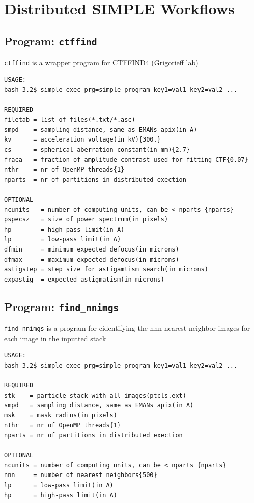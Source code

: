 \documentclass[a4paper,11pt]{article}
\newcommand{\prgname}[1]{\textcolor{NavyBlue}{\texttt{#1}}}
\begin{document}
\section{Distributed SIMPLE Workflows}
\subsection{Program: \prgname{ctffind}}
\label{ctffind}
\prgname{ctffind} is a wrapper program for CTFFIND4 (Grigorieff lab)

\begin{verbatim}
USAGE:
bash-3.2$ simple_exec prg=simple_program key1=val1 key2=val2 ...

REQUIRED
filetab = list of files(*.txt/*.asc)
smpd    = sampling distance, same as EMANs apix(in A)
kv      = acceleration voltage(in kV){300.}
cs      = spherical aberration constant(in mm){2.7}
fraca   = fraction of amplitude contrast used for fitting CTF{0.07}
nthr    = nr of OpenMP threads{1}
nparts  = nr of partitions in distributed exection

OPTIONAL
ncunits   = number of computing units, can be < nparts {nparts}
pspecsz   = size of power spectrum(in pixels)
hp        = high-pass limit(in A)
lp        = low-pass limit(in A)
dfmin     = minimum expected defocus(in microns)
dfmax     = maximum expected defocus(in microns)
astigstep = step size for astigamtism search(in microns)
expastig  = expected astigmatism(in microns)
\end{verbatim}

\subsection{Program: \prgname{find\_nnimgs}}
\label{find_nnimgs}
\prgname{find\_nnimgs} is a program for cidentifying the nnn nearest neighbor images for each image in the inputted stack

\begin{verbatim}
USAGE:
bash-3.2$ simple_exec prg=simple_program key1=val1 key2=val2 ...

REQUIRED
stk    = particle stack with all images(ptcls.ext)
smpd   = sampling distance, same as EMANs apix(in A)
msk    = mask radius(in pixels)
nthr   = nr of OpenMP threads{1}
nparts = nr of partitions in distributed exection

OPTIONAL
ncunits = number of computing units, can be < nparts {nparts}
nnn     = number of nearest neighbors{500}
lp      = low-pass limit(in A)
hp      = high-pass limit(in A)
\end{verbatim}
\end{document}
